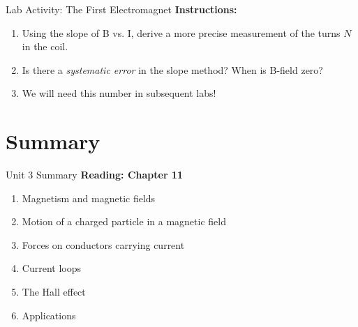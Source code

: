 \documentclass{beamer}
\begin{document}
\begin{frame}{Lab Activity: The First Electromagnet}
\textbf{Instructions:}
\begin{enumerate}
\item Using the slope of B vs. I, derive a more precise measurement of the turns $N$ in the coil.
\item Is there a \textit{systematic error} in the slope method?  When is B-field zero?
\item We will need this number in subsequent labs!
\end{enumerate}
\end{frame}

\section{Summary}

\begin{frame}{Unit 3 Summary}
\textbf{Reading: Chapter 11}
\begin{enumerate}
\item Magnetism and magnetic fields
\item Motion of a charged particle in a magnetic field
\item Forces on conductors carrying current
\item Current loops
\item The Hall effect
\item Applications
\end{enumerate}
\end{frame}
\end{document}
